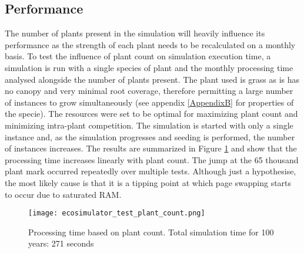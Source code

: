 \subsection{Performance} \label{subsec:ecosytem_performance}

The number of plants present in the simulation will heavily influence its performance as the strength of each plant needs to be recalculated on a monthly basis. To test the influence of plant count on simulation execution time, a simulation is run with a single species of plant and the monthly processing time analysed alongside the number of plants present. The plant used is grass as is has no canopy and very minimal root coverage, therefore permitting a large number of instances to grow simultaneously (see appendix \ref{AppendixB} for properties of the specie). The resources were set to be optimal for maximizing plant count and minimizing intra-plant competition. The simulation is started with only a single instance and, as the simulation progresses and seeding is performed, the number of instances increases. The results are summarized in Figure \ref{fig:ecosimulator_test_plant_count} and show that the processing time increases linearly with plant count. The jump at the 65 thousand plant mark occurred repeatedly over multiple tests. Although just a hypothesise, the most likely cause is that it is a tipping point at which page swapping starts to occur due to saturated RAM.\\

\begin{figure}
\center
	\texttt{[image: ecosimulator\_test\_plant\_count.png]}
	\caption{ Processing time based on plant count. Total simulation time for 100 years: 271 seconds}	
	\label{fig:ecosimulator_test_plant_count}
\end{figure}

